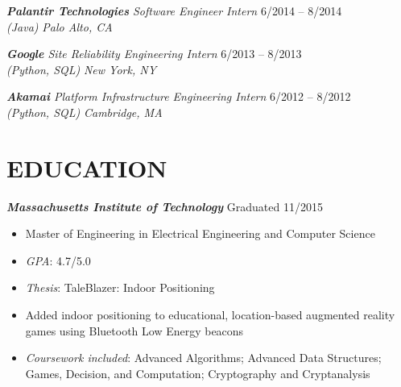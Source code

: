 \documentclass[margin]{res}
\begin{document}
\begin{resume}
                    {\sl{\bf Palantir Technologies} Software Engineer Intern} 
                    \hfill 6/2014 -- 8/2014 \\
                    {\sl (Java)}
                    \hfill{\sl  Palo Alto, CA}


                    {\sl{\bf Google} Site Reliability Engineering Intern} 
                    \hfill 6/2013 -- 8/2013 \\
                    {\sl (Python, SQL)}
                    \hfill {\sl  New York, NY}


                    {\sl {\bf Akamai} 
                      Platform Infrastructure Engineering Intern} 
                    \hfill 6/2012 -- 8/2012 \\
                    {\sl (Python, SQL)}
                    \hfill {\sl Cambridge, MA}


\section{EDUCATION} {\sl \bf Massachusetts Institute of Technology} 
                    \hfill Graduated 11/2015
                    \begin{itemize} \itemsep -2pt %
                        \item Master of Engineering in Electrical Engineering
                          and Computer Science
                        \item {\sl GPA}: 4.7/5.0
                        \item {\sl Thesis}: TaleBlazer: Indoor Positioning
                        \item Added indoor positioning to
                          educational, location-based augmented reality games
                          using Bluetooth Low Energy beacons
                        \item {\sl Coursework included}:
                          Advanced Algorithms;
                          Advanced Data Structures;
                          Games, Decision, and Computation;
                          Cryptography and Cryptanalysis
                    \end{itemize}


\end{resume}
\end{document}

